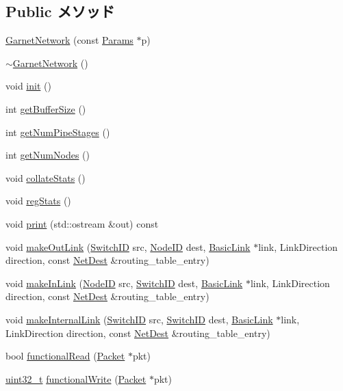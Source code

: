 \subsection*{Public メソッド}
\begin{DoxyCompactItemize}
\item 
\hyperlink{classGarnetNetwork_a6af3413f2d3550ac59fe1970d3b63972}{GarnetNetwork} (const \hyperlink{classGarnetNetwork_af1f02e00eac1bf3521780f99a28259a5}{Params} $\ast$p)
\item 
\hyperlink{classGarnetNetwork_a4bffba7842c2ab1ee504e3effcb14a40}{$\sim$GarnetNetwork} ()
\item 
void \hyperlink{classGarnetNetwork_a02fd73d861ef2e4aabb38c0c9ff82947}{init} ()
\item 
int \hyperlink{classGarnetNetwork_adaa0495495ece419f5911bc378971502}{getBufferSize} ()
\item 
int \hyperlink{classGarnetNetwork_a85c15b418bb9035ede7df102e4bc9cea}{getNumPipeStages} ()
\item 
int \hyperlink{classGarnetNetwork_a52ab76ba6f0a40a06c6fc4043351824e}{getNumNodes} ()
\item 
void \hyperlink{classGarnetNetwork_a208669cbc0bb1d52565956ca8c690c55}{collateStats} ()
\item 
void \hyperlink{classGarnetNetwork_a4dc637449366fcdfc4e764cdf12d9b11}{regStats} ()
\item 
void \hyperlink{classGarnetNetwork_ac55fe386a101fbae38c716067c9966a0}{print} (std::ostream \&out) const 
\item 
void \hyperlink{classGarnetNetwork_a87915d87a2b4c11ae5f0f4da31bd2375}{makeOutLink} (\hyperlink{TypeDefines_8hh_ac925a332c83eaf1e40e056e7a20ebcd8}{SwitchID} src, \hyperlink{TypeDefines_8hh_a83c14b4ae37e80071f6b3506a6c46151}{NodeID} dest, \hyperlink{classBasicLink}{BasicLink} $\ast$link, LinkDirection direction, const \hyperlink{classNetDest}{NetDest} \&routing\_\-table\_\-entry)
\item 
void \hyperlink{classGarnetNetwork_ac4cf8ff50e877f26606c24880c73fb9d}{makeInLink} (\hyperlink{TypeDefines_8hh_a83c14b4ae37e80071f6b3506a6c46151}{NodeID} src, \hyperlink{TypeDefines_8hh_ac925a332c83eaf1e40e056e7a20ebcd8}{SwitchID} dest, \hyperlink{classBasicLink}{BasicLink} $\ast$link, LinkDirection direction, const \hyperlink{classNetDest}{NetDest} \&routing\_\-table\_\-entry)
\item 
void \hyperlink{classGarnetNetwork_a035f37231d3a7edcadd92b7d9e17d4e4}{makeInternalLink} (\hyperlink{TypeDefines_8hh_ac925a332c83eaf1e40e056e7a20ebcd8}{SwitchID} src, \hyperlink{TypeDefines_8hh_ac925a332c83eaf1e40e056e7a20ebcd8}{SwitchID} dest, \hyperlink{classBasicLink}{BasicLink} $\ast$link, LinkDirection direction, const \hyperlink{classNetDest}{NetDest} \&routing\_\-table\_\-entry)
\item 
bool \hyperlink{classGarnetNetwork_a729f57f557bb42c045c47d9388f1030e}{functionalRead} (\hyperlink{classPacket}{Packet} $\ast$pkt)
\item 
\hyperlink{Type_8hh_a435d1572bf3f880d55459d9805097f62}{uint32\_\-t} \hyperlink{classGarnetNetwork_ad07b9def1d6f5e5f988a254c3a9d1ad9}{functionalWrite} (\hyperlink{classPacket}{Packet} $\ast$pkt)
\end{DoxyCompactItemize}
